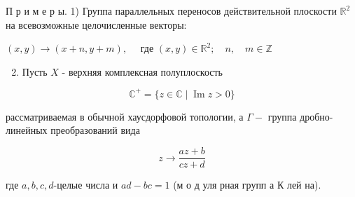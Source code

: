 \documentclass[10pt]{article}
\begin{document}
П р и м е р ы. 1) Группа параллельных переносов действительной плоскости $\mathbb{R}^{2}$ на всевозможные целочисленные векторы:



$(x, y) \longrightarrow(x+n, y+m), \quad$ где $(x, y) \in \mathbb{R}^{2} ; \quad n, \quad m \in \mathbb{Z}$



\begin{enumerate}

  \setcounter{enumi}{1}

  \item Пусть $X$ - верхняя комплексная полуплоскость

\end{enumerate}



\[

\mathbb{C}^{+}=\{z \in \mathbb{C} \mid \operatorname{Im} z>0\}

\]



рассматриваемая в обычной хаусдорфовой топологии, а $\Gamma-$ группа дробно-линейных преобразований вида



\[

z \longrightarrow \frac{a z+b}{c z+d}

\]



где $a, b, c, d$-целые числа и $a d-b c=1$ (м о д уля рная групп а К лей на).
\end{document}
